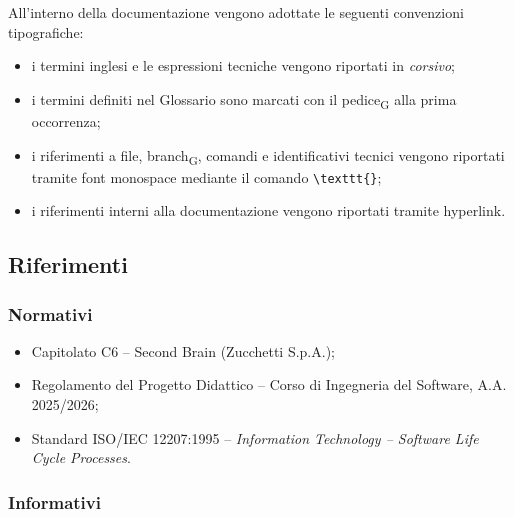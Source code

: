 All'interno della documentazione vengono adottate le seguenti convenzioni tipografiche:

\begin{itemize}
    \item i termini inglesi e le espressioni tecniche vengono riportati in \textit{corsivo};
    \item i termini definiti nel Glossario sono marcati con il pedice\textsubscript{G} alla prima occorrenza;
    \item i riferimenti a file, branch\textsubscript{G}, comandi e identificativi tecnici vengono riportati tramite font monospace mediante il comando \texttt{\textbackslash texttt\{\}};
    \item i riferimenti interni alla documentazione vengono riportati tramite hyperlink.
\end{itemize}


\subsection{Riferimenti}

\subsubsection{Normativi}

\begin{itemize}

    \item
    {Capitolato C6 -- Second Brain (Zucchetti S.p.A.)};

    \item
    {Regolamento del Progetto Didattico -- Corso di Ingegneria del Software, A.A. 2025/2026};

    \item
    {Standard ISO/IEC 12207:1995} --
    \textit{Information Technology -- Software Life Cycle Processes}.

\end{itemize}

\subsubsection{Informativi}

